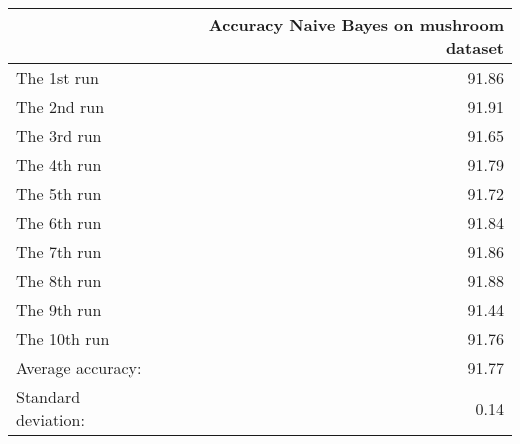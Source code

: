 \begin{tabular}{lr}
\toprule
{} &  Accuracy Naive Bayes on mushroom dataset \\
\midrule
The 1st run         &                                     91.86 \\
The 2nd run         &                                     91.91 \\
The 3rd run         &                                     91.65 \\
The 4th run         &                                     91.79 \\
The 5th run         &                                     91.72 \\
The 6th run         &                                     91.84 \\
The 7th run         &                                     91.86 \\
The 8th run         &                                     91.88 \\
The 9th run         &                                     91.44 \\
The 10th run        &                                     91.76 \\
Average accuracy:   &                                     91.77 \\
Standard deviation: &                                      0.14 \\
\bottomrule
\end{tabular}
